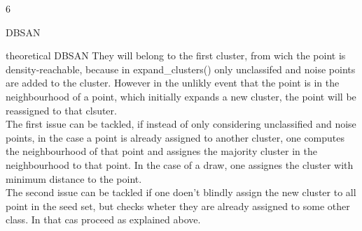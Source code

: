 \documentclass{article}
\begin{document}
\begin{ukon-infie}[5.12.17]{6}
\begin{exercise}[p=6]{DBSAN}
		\end{exercise}
		
		\begin{exercise}[p=3]{theoretical DBSAN}
		{
		They will belong to the first cluster, from wich the point is density-reachable, because in expand\_clusters() only unclassifed and noise points are added to the cluster. However in the unlikly event that the point is in the neighbourhood of a point, which initially expands a new cluster, the point will be reassigned to that clsuter.\\
		
		The first issue can be tackled, if instead of only considering unclassified and noise points, in the case a point is already assigned to another cluster, one computes the neighbourhood of that point and assignes the majority cluster in the neighbourhood to that point. In the case of a draw, one assignes the cluster with minimum distance to the point.\\
		
		The second issue can be tackled if one doen't blindly assign the new cluster to all point in the seed set, but checks wheter they are already assigned to some other class. In that cas proceed as explained above.
		}
	
		\end{exercise}
		
		
\end{ukon-infie}
\end{document}
